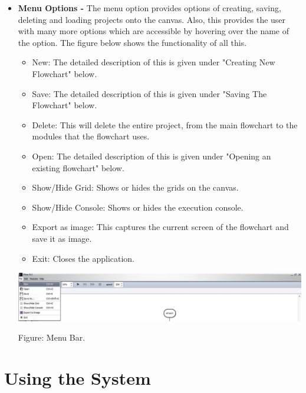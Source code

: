 \documentclass[11pt,a4paper,titlepage]{article}
\begin{document}
\begin{itemize}
						
			\item \textbf{Menu Options -} The menu option provides options of creating, saving, deleting and loading projects onto the canvas. Also, this provides the user with many more options which are accessible by hovering over the name of the option. The figure below shows the functionality of all this.\newline 
		
		\begin{itemize}
		\item New: The detailed description of this is given under "Creating New Flowchart"  below.
		\item Save:  The detailed description of this is given under "Saving The Flowchart" below.
		\item Delete: This will delete the entire project, from the main flowchart to the modules that the flowchart uses.
		\item Open: The detailed description of this is given under "Opening an existing flowchart" below.
		\item Show/Hide Grid: Shows or hides the grids on the canvas.
		\item Show/Hide Console: Shows or hides the execution console.
		\item Export as image: This captures the current screen of the flowchart and save it as image.
		\item Exit: Closes the application.\newline
		\end{itemize}				
			
		\includegraphics[width=14cm]{images/Menu.jpg}
		\begin{center}
			Figure: Menu Bar. \newline \newline \newline
		\end{center}
			
			
		\end{itemize}
	
	
	

\section{Using the System}
\end{document}
